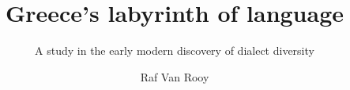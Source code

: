 \author{Raf Van Rooy}
\title{Greece’s labyrinth of language}
\subtitle{A study in the early modern discovery of dialect diversity}
\renewcommand{\lsSeries}{hpls}
\renewcommand{\lsSeriesNumber}{}
\renewcommand{\lsID}{253}
\dedication{{To} {my} {parents,} {whose} {love} {speaks} {its} {own} {dialect}}









 
